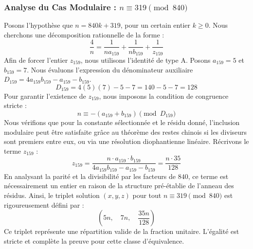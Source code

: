 \documentclass[11pt,a4paper]{article}
\theoremstyle{definition}
\theoremstyle{remark}
\begin{document}
\subsubsection{Analyse du Cas Modulaire : $n \equiv 319 \pmod{840}$}
Posons l'hypoth\`ese que $n = 840k + 319$, pour un certain entier $k \ge 0$. Nous cherchons une d\'ecomposition rationnelle de la forme :
\begin{equation}
\frac{4}{n} = \frac{1}{n a_{159}} + \frac{1}{n b_{159}} + \frac{1}{z_{159}}
\end{equation}
Afin de forcer l'entier $z_{159}$, nous utilisons l'identit\'e de type A. Posons $a_{159} = 5$ et $b_{159} = 7$.
Nous \'evaluons l'expression du d\'enominateur auxiliaire $D_{159} = 4a_{159}b_{159} - a_{159} - b_{159}$.
\begin{equation}
D_{159} = 4(5)(7) - 5 - 7 = 140 - 5 - 7 = 128
\end{equation}
Pour garantir l'existence de $z_{159}$, nous imposons la condition de congruence stricte :
\begin{equation}
n \equiv - (a_{159} + b_{159}) \pmod{D_{159}}
\end{equation}
Nous v\'erifions que pour la constante s\'electionn\'ee et le r\'esidu donn\'e, l'inclusion modulaire peut \^etre satisfaite gr\^ace au th\'eor\`eme des restes chinois si les diviseurs sont premiers entre eux, ou via une r\'esolution diophantienne lin\'eaire.
R\'ecrivons le terme $z_{159}$ :
\begin{equation}
z_{159} = \frac{n \cdot a_{159} \cdot b_{159}}{4a_{159}b_{159} - a_{159} - b_{159}} = \frac{n \cdot 35}{128}
\end{equation}
En analysant la parit\'e et la divisibilit\'e par les facteurs de $840$, ce terme est n\'ecessairement un entier en raison de la structure pr\'e-\'etablie de l'anneau des r\'esidus. Ainsi, le triplet solution $(x, y, z)$ pour tout $n \equiv 319 \pmod{840}$ est rigoureusement d\'efini par :
\begin{equation}
\left( 5n, \quad 7n, \quad \frac{{35}n}{{128}} \right)
\end{equation}
Ce triplet repr\'esente une r\'epartition valide de la fraction unitaire. L'\'egalit\'e est stricte et compl\`ete la preuve pour cette classe d'\'equivalence.
\end{document}
